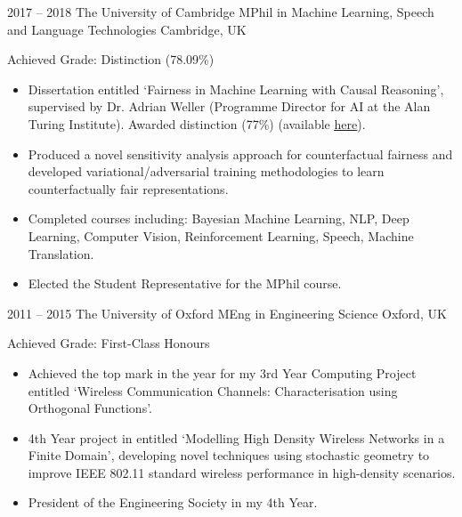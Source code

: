 \documentclass[]{friggeri-cv} %
\begin{document}
\begin{entrylist}


\entry
{2017 -- 2018}
{The University of Cambridge}
{MPhil {\normalfont in Machine Learning, Speech and Language Technologies }}
{Cambridge, UK}
{Achieved Grade: Distinction (78.09\%)
	\begin{itemize}
        \item Dissertation entitled `Fairness in Machine Learning with Causal Reasoning', supervised by Dr. Adrian Weller (Programme Director for AI at the Alan Turing Institute). Awarded distinction (77\%) (available \href{https://fiorenza2.github.io/pdfs/thesis.pdf}{\underline{here}}).
        \item Produced a novel sensitivity analysis approach for counterfactual fairness and developed variational/adversarial training methodologies to learn counterfactually fair representations. 
        \item Completed courses including: Bayesian Machine Learning, NLP, Deep Learning, Computer Vision, Reinforcement Learning, Speech, Machine Translation.
        \item Elected the Student Representative for the MPhil course.
	\end{itemize}}



\entry
{2011 -- 2015}
{The University of Oxford}
{MEng {\normalfont in Engineering Science}}
{Oxford, UK}
{Achieved Grade: First-Class Honours
	\begin{itemize}
		\item Achieved the top mark in the year for my 3rd Year Computing Project entitled `Wireless Communication Channels: Characterisation using Orthogonal Functions'.
		\item 4th Year project in entitled `Modelling High Density Wireless Networks in a Finite Domain’, developing
        novel techniques using stochastic geometry to improve IEEE 802.11 standard wireless performance in high-density
        scenarios.
		\item President of the Engineering Society in my 4th Year.
	\end{itemize}}


\end{entrylist}
\end{document}
